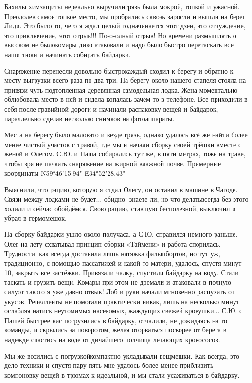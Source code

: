 Бахилы химзащиты нереально выручили\mdash грязь была мокрой, топкой и ужасной. Преодолев самое топкое место, мы пробрались сквозь заросли и вышли на берег Лиди. Это было то, чего я ждал целый год\mdash начинается этот дзен, это отчуждение, это приключение, этот отрыв!!! По-о-олный отрыв! Но времени размышлять о высоком не было\mdash комары дико атаковали и надо было быстро перетаскать все наши тюки и начинать собирать байдарки. 

Снаряжение перенесли довольно быстро\mdash каждый сходил к берегу и обратно к месту выгрузки всего раза по два-три. На берегу около нашего стапеля стояла на привязи чуть подтопленная деревянная самодельная лодка. Жена моментально облюбовала место в ней и сидела копалась зачем-то в телефоне. Все приходили в себя после гравийной дороги и начинали распаковку вещей и байдарок, параллельно сделав несколько снимков на фотоаппараты. 

Места на берегу было маловато и везде грязь, однако удалось всё же найти более менее чистый участок с травой, где мы и начали сборку своей трёшки вместе с женой и Олегом. С.Ю. и Паша собирались тут же, в пяти метрах, тоже на траве, чтобы зря не пачкать снаряжение на жирной влажной почве. Примерные координаты N59°46'15.94" E34°52'28.43".

Выяснили, что рацию, которую я отдал Олегу, он оставил в машине в Чагоде. Связи между лодками не будет$\ldots$ обидно, знаете ли, но что делать\mdash всегда без этого ходили и сейчас обойдёмся. Свою рацию, ставшую бесполезной, выключил и убрал в гермомешок.

На сборку байдарки ушло около получаса, а С.Ю. справился немного раньше. Олег на лету схватывал принцип сборки «Таймени» и работа спорилась. Трудности, как всегда доставила лишь натяжка фальшбортов, но тут уж, традиционно, с помощью пассатижей и какой-то матери, удалось, спустя минут 10, закрыть все застёжки. Привязали чалку, спустили байдарку на воду. Стали таскать и грузить вещи. Комары при этом не дремали и атаковали в полную силу\mdash от такого я уже давно отвык! Лоб и руки начали мгновенно распухать от укусов. Репелленты не помогали практически никак, лишь на несколько минут ослабляя натиск неутомимых насекомых, жаждущих свежей кровушки$\ldots$ С.Ю. с Пашей быстрее нас погрузились в байдарку, отчалили, не дожидаясь на то команды, и скрылись за поворотом, желая оторваться поскорее от берега в надежде спастись на воде от дичайшего полчища летающих кровососов.

Мы же возились с погрузкой\mdash компактно укладывали вещмешки. Как всегда, это дело техники и спустя пару пять мне удалось более менее приблизить компоновку вещей в трюмах к идеальной, и мы стали усаживаться в байдарку. 

